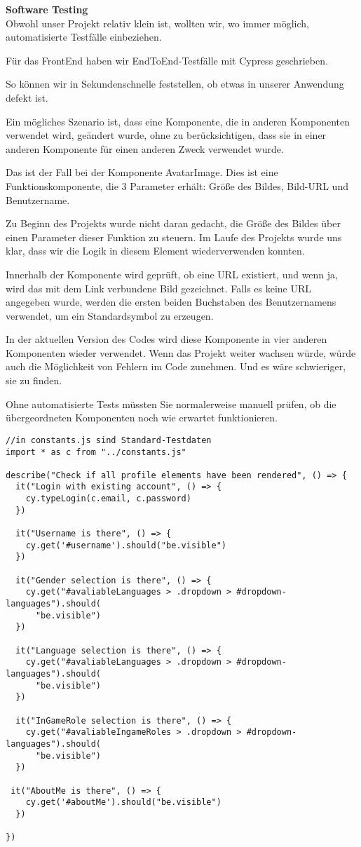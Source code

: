 \textbf{Software Testing }\\
Obwohl unser Projekt relativ klein ist, wollten wir, wo immer möglich, automatisierte Testfälle einbeziehen.

Für das FrontEnd haben wir EndToEnd-Testfälle mit Cypress geschrieben.

So können wir in Sekundenschnelle feststellen, ob etwas in unserer Anwendung defekt ist.

Ein mögliches Szenario ist, dass eine Komponente, die in anderen Komponenten verwendet wird, geändert wurde, ohne zu berücksichtigen, dass sie in einer anderen Komponente für einen anderen Zweck verwendet wurde.

Das ist der Fall bei der Komponente AvatarImage.
Dies ist eine Funktionskomponente, die 3 Parameter erhält: Größe des Bildes, Bild-URL und Benutzername.

Zu Beginn des Projekts wurde nicht daran gedacht, die Größe des Bildes über einen Parameter dieser Funktion zu steuern. Im Laufe des Projekts wurde uns klar, dass wir die Logik in diesem Element wiederverwenden konnten.

Innerhalb der Komponente wird geprüft, ob eine URL existiert, und wenn ja, wird das mit dem Link verbundene Bild gezeichnet. Falls es keine URL  angegeben wurde, werden die ersten beiden Buchstaben des Benutzernamens verwendet, um ein Standardsymbol zu erzeugen.

In der aktuellen Version des Codes wird diese Komponente in vier anderen Komponenten wieder verwendet.
Wenn das Projekt weiter wachsen würde, würde auch die Möglichkeit von Fehlern im Code zunehmen. Und es wäre schwieriger, sie zu finden.

Ohne automatisierte Tests müssten Sie normalerweise manuell prüfen, ob die übergeordneten Komponenten noch wie erwartet funktionieren.


\begin{lstlisting}
//in constants.js sind Standard-Testdaten
import * as c from "../constants.js"

describe("Check if all profile elements have been rendered", () => {
  it("Login with existing account", () => {
    cy.typeLogin(c.email, c.password)
  })

  it("Username is there", () => {
    cy.get('#username').should("be.visible")
  })

  it("Gender selection is there", () => {
    cy.get("#avaliableLanguages > .dropdown > #dropdown-languages").should(
      "be.visible")
  })

  it("Language selection is there", () => {
    cy.get("#avaliableLanguages > .dropdown > #dropdown-languages").should(
      "be.visible")
  })

  it("InGameRole selection is there", () => {
    cy.get("#avaliableIngameRoles > .dropdown > #dropdown-languages").should(
      "be.visible")
  })

 it("AboutMe is there", () => {
    cy.get('#aboutMe').should("be.visible")
  })
  
})
\end{lstlisting}

